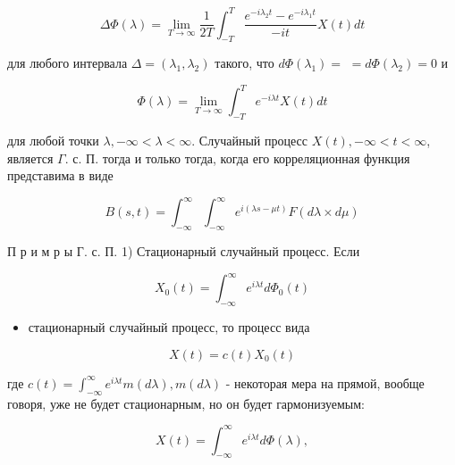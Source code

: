 \documentclass[10pt]{article}
\begin{document}
\[

\Delta \Phi(\lambda)=\lim _{T \rightarrow \infty} \frac{1}{2 T} \int_{-T}^{T} \frac{e^{-i \lambda_{2} t}-e^{-i \lambda_{1} t}}{-i t} X(t) d t

\]



для любого интервала $\Delta=\left(\lambda_{1}, \lambda_{2}\right)$ такого, что $d \Phi\left(\lambda_{1}\right)=$ $=d \Phi\left(\lambda_{2}\right)=0$ и



\[

\Phi(\lambda)=\lim _{T \rightarrow \infty} \int_{-T}^{T} e^{-i \lambda t} X(t) d t

\]



для любой точки $\lambda,-\infty<\lambda<\infty$. Случайный процесс $X(t),-\infty<t<\infty$, является $\Gamma$. с. П. тогда и только тогда, когда его корреляционная функция представима в виде



\[

B(s, t)=\int_{-\infty}^{\infty} \int_{-\infty}^{\infty} e^{i(\lambda s-\mu t)} F(d \lambda \times d \mu)

\]



П р и м р ы Г. с. П. 1) Стационарный случайный процесс. Если



\[

X_{0}(t)=\int_{-\infty}^{\infty} e^{i \lambda t} d \Phi_{0}(t)

\]



\begin{itemize}

  \item стационарный случайный процесс, то процесс вида

\end{itemize}



\[

X(t)=c(t) X_{0}(t)

\]



где $c(t)=\int_{-\infty}^{\infty} e^{i \lambda t} m(d \lambda), m(d \lambda)$ - некоторая мера на прямой, вообще говоря, уже не будет стационарным, но он будет гармонизуемым:



\[

X(t)=\int_{-\infty}^{\infty} e^{i \lambda t} d \Phi(\lambda),

\]
\end{document}
